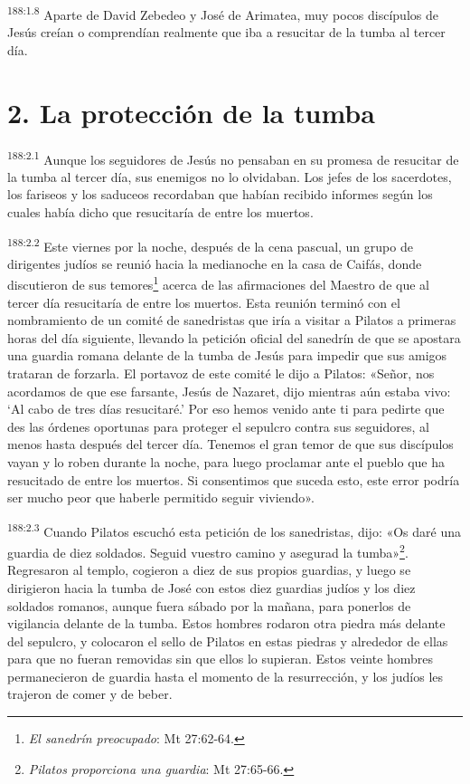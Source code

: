 \par
\textsuperscript{188:1.8} Aparte de David Zebedeo y José de Arimatea, muy pocos discípulos de Jesús creían o comprendían realmente que iba a resucitar de la tumba al tercer día.

\section*{2. La protección de la tumba}
\par
\textsuperscript{188:2.1} Aunque los seguidores de Jesús no pensaban en su promesa de resucitar de la tumba al tercer día, sus enemigos no lo olvidaban. Los jefes de los sacerdotes, los fariseos y los saduceos recordaban que habían recibido informes según los cuales había dicho que resucitaría de entre los muertos.

\par
\textsuperscript{188:2.2} Este viernes por la noche, después de la cena pascual, un grupo de dirigentes judíos se reunió hacia la medianoche en la casa de Caifás, donde discutieron de sus temores\footnote{\textit{El sanedrín preocupado}: Mt 27:62-64.} acerca de las afirmaciones del Maestro de que al tercer día resucitaría de entre los muertos. Esta reunión terminó con el nombramiento de un comité de sanedristas que iría a visitar a Pilatos a primeras horas del día siguiente, llevando la petición oficial del sanedrín de que se apostara una guardia romana delante de la tumba de Jesús para impedir que sus amigos trataran de forzarla. El portavoz de este comité le dijo a Pilatos: «Señor, nos acordamos de que ese farsante, Jesús de Nazaret, dijo mientras aún estaba vivo: `Al cabo de tres días resucitaré.' Por eso hemos venido ante ti para pedirte que des las órdenes oportunas para proteger el sepulcro contra sus seguidores, al menos hasta después del tercer día. Tenemos el gran temor de que sus discípulos vayan y lo roben durante la noche, para luego proclamar ante el pueblo que ha resucitado de entre los muertos. Si consentimos que suceda esto, este error podría ser mucho peor que haberle permitido seguir viviendo».

\par
\textsuperscript{188:2.3} Cuando Pilatos escuchó esta petición de los sanedristas, dijo: «Os daré una guardia de diez soldados. Seguid vuestro camino y asegurad la tumba»\footnote{\textit{Pilatos proporciona una guardia}: Mt 27:65-66.}. Regresaron al templo, cogieron a diez de sus propios guardias, y luego se dirigieron hacia la tumba de José con estos diez guardias judíos y los diez soldados romanos, aunque fuera sábado por la mañana, para ponerlos de vigilancia delante de la tumba. Estos hombres rodaron otra piedra más delante del sepulcro, y colocaron el sello de Pilatos en estas piedras y alrededor de ellas para que no fueran removidas sin que ellos lo supieran. Estos veinte hombres permanecieron de guardia hasta el momento de la resurrección, y los judíos les trajeron de comer y de beber.

